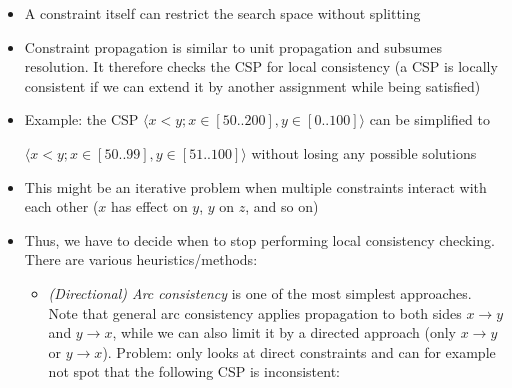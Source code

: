 \begin{itemize}
	\item A constraint itself can restrict the search space without splitting
	\item Constraint propagation is similar to unit propagation and subsumes resolution. It therefore checks the CSP for local consistency (a CSP is locally consistent if we can extend it by another assignment while being satisfied)
	\item Example: the CSP $\langle x < y ; x \in \left[50..200\right], y \in \left[0..100\right] \rangle$ can be simplified to 
	
	$\langle x < y ; x \in \left[50..99\right], y \in \left[51..100\right] \rangle$ without losing any possible solutions
	\item This might be an iterative problem when multiple constraints interact with each other ($x$ has effect on $y$, $y$ on $z$, and so on)
	\item Thus, we have to decide when to stop performing local consistency checking. There are various heuristics/methods:
	\begin{itemize}
		\item \textit{(Directional) Arc consistency} is one of the most simplest approaches. Note that general arc consistency applies propagation to both sides $x\to y$ and $y\to x$, while we can also limit it by a directed approach (only $x\to y$ or $y\to x$). Problem: only looks at direct constraints and can for example not spot that the following CSP is inconsistent:
		

\end{itemize}
\end{itemize}
